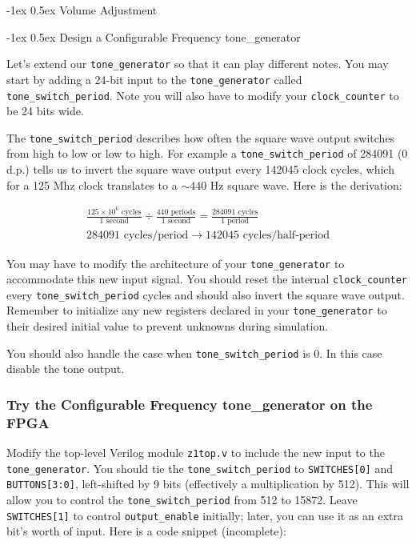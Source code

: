 \documentclass[11pt]{article}
\makeatletter
\renewcommand{\subsection}
{\@startsection {subsection}{1}{0pt}
 {-1ex}
 {0.5ex}
 {\bfseries\normalsize}}
\makeatother
\begin{document}
\subsection{Volume Adjustment}

\subsection{Design a Configurable Frequency tone\_generator}

Let's extend our \verb|tone_generator| so that it can play different notes. You may start by adding a 24-bit input to the \verb|tone_generator| called \verb|tone_switch_period|. Note you will also have to modify your \verb|clock_counter| to be 24 bits wide.

The \verb|tone_switch_period| describes how often the square wave output switches from high to low or low to high. For example a \verb|tone_switch_period| of 284091 (0 d.p.) tells us to invert the square wave output every 142045 clock cycles, which for a 125 Mhz clock translates to a $\sim 440$ Hz square wave. Here is the derivation:

\begin{eqnarray}
  \frac{125 \times 10^6 \text{ cycles}}{1 \text{ second}} \div \frac{440 \text{ periods}}{1 \text{ second}} = \frac{ 284091 \text{ cycles}}{1 \text{ period}} \nonumber \\
  284091 \text{ cycles/period} \rightarrow 142045 \text{ cycles/half-period} \nonumber
\end{eqnarray}

You may have to modify the architecture of your \verb|tone_generator| to accommodate this new input signal. You should reset the internal \verb|clock_counter| every \verb|tone_switch_period| cycles and should also invert the square wave output. Remember to initialize any new registers declared in your \verb|tone_generator| to their desired initial value to prevent unknowns during simulation.

You should also handle the case when \verb|tone_switch_period| is 0.  In this case disable the tone output.

\subsubsection{Try the Configurable Frequency tone\_generator on the FPGA}
Modify the top-level Verilog module \verb|z1top.v| to include the new input to the \verb|tone_generator|. You should tie the \verb|tone_switch_period| to \verb|SWITCHES[0]| and \verb|BUTTONS[3:0]|, left-shifted by 9 bits (effectively a multiplication by 512). This will allow you to control the \verb|tone_switch_period| from 512 to 15872. Leave \verb|SWITCHES[1]| to control \verb|output_enable| initially; later, you can use it as an extra bit's worth of input. Here is a code snippet (incomplete):
\end{document}
